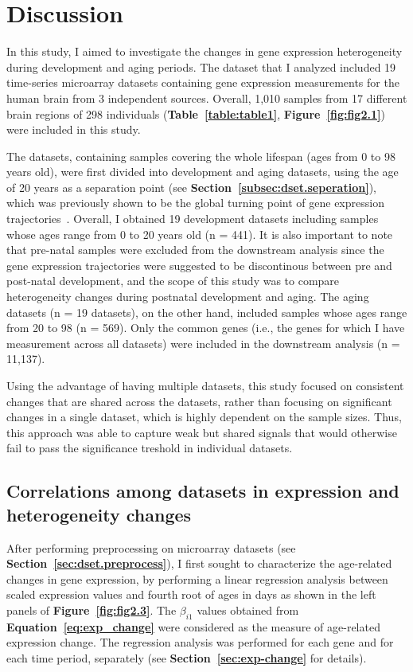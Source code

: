 \chapter{Discussion}
\label{chp:b4}

In this study, I aimed to investigate the changes in gene expression heterogeneity during development and aging periods.
The dataset that I analyzed included 19 time-series microarray datasets containing gene expression measurements for the human brain from 3 independent sources.
Overall, 1,010 samples from 17 different brain regions of 298 individuals (\textbf{Table~\ref{table:table1}}, \textbf{Figure~\ref{fig:fig2.1}}) were included in this study.

The datasets, containing samples covering the whole lifespan (ages from 0 to 98 years old), 
were first divided into development and aging datasets,
using the age of 20 years as a separation point (see \textbf{Section~\ref{subsec:dset.seperation}}), 
which was previously shown to be the global turning point of gene expression trajectories~\autocite{Donertas2017, Colantuoni2011, Somel2010}.
Overall, I obtained 19 development datasets including samples whose ages range from 0 to 20 years old (n = 441).
It is also important to note that pre-natal samples were excluded from the downstream analysis
since the gene expression trajectories were suggested to be discontinous between pre and post-natal development, 
and the scope of this study was to compare heterogeneity changes during postnatal development and aging.
The aging datasets (n = 19 datasets), on the other hand, included samples whose ages range from 20 to 98 (n = 569).
Only the common genes (i.e., the genes for which I have measurement across all datasets) were included in the downstream analysis (n = 11,137).

Using the advantage of having multiple datasets, this study focused on consistent changes that are shared across the datasets, 
rather than focusing on significant changes in a single dataset, which is highly dependent on the sample sizes. 
Thus, this approach was able to capture weak but shared signals that would otherwise fail to pass the significance treshold in individual datasets.

\section{Correlations among datasets in expression and heterogeneity changes}
After performing preprocessing on microarray datasets (see \textbf{Section~\ref{sec:dset.preprocess}}), 
I first sought to characterize the age-related changes in gene expression, 
by performing a linear regression analysis between scaled expression values and 
fourth root of ages in days as shown in the left panels of \textbf{Figure~\ref{fig:fig2.3}}.
The $\beta_{i1}$ values obtained from \textbf{Equation~\ref{eq:exp_change}} were considered as the measure of age-related expression change.
The regression analysis was performed for each gene and for each time period, separately (see \textbf{Section~\ref{sec:exp-change}} for details).

